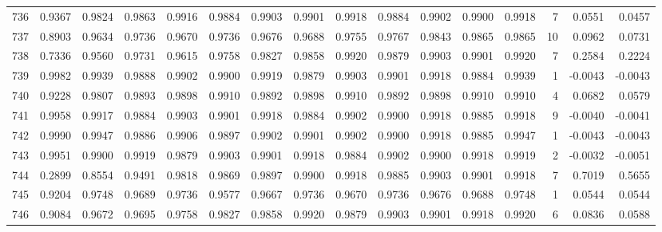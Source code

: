 \begin{tabular}{lrrrrrrrrrrrrrrr}
736 &      0.9367 &  0.9824 &  0.9863 &  0.9916 &  0.9884 &  0.9903 &  0.9901 &  0.9918 &  0.9884 &  0.9902 &   0.9900 &     0.9918 &      7 &                    0.0551 &                     0.0457 \\
737 &      0.8903 &  0.9634 &  0.9736 &  0.9670 &  0.9736 &  0.9676 &  0.9688 &  0.9755 &  0.9767 &  0.9843 &   0.9865 &     0.9865 &     10 &                    0.0962 &                     0.0731 \\
738 &      0.7336 &  0.9560 &  0.9731 &  0.9615 &  0.9758 &  0.9827 &  0.9858 &  0.9920 &  0.9879 &  0.9903 &   0.9901 &     0.9920 &      7 &                    0.2584 &                     0.2224 \\
739 &      0.9982 &  0.9939 &  0.9888 &  0.9902 &  0.9900 &  0.9919 &  0.9879 &  0.9903 &  0.9901 &  0.9918 &   0.9884 &     0.9939 &      1 &                   -0.0043 &                    -0.0043 \\
740 &      0.9228 &  0.9807 &  0.9893 &  0.9898 &  0.9910 &  0.9892 &  0.9898 &  0.9910 &  0.9892 &  0.9898 &   0.9910 &     0.9910 &      4 &                    0.0682 &                     0.0579 \\
741 &      0.9958 &  0.9917 &  0.9884 &  0.9903 &  0.9901 &  0.9918 &  0.9884 &  0.9902 &  0.9900 &  0.9918 &   0.9885 &     0.9918 &      9 &                   -0.0040 &                    -0.0041 \\
742 &      0.9990 &  0.9947 &  0.9886 &  0.9906 &  0.9897 &  0.9902 &  0.9901 &  0.9902 &  0.9900 &  0.9918 &   0.9885 &     0.9947 &      1 &                   -0.0043 &                    -0.0043 \\
743 &      0.9951 &  0.9900 &  0.9919 &  0.9879 &  0.9903 &  0.9901 &  0.9918 &  0.9884 &  0.9902 &  0.9900 &   0.9918 &     0.9919 &      2 &                   -0.0032 &                    -0.0051 \\
744 &      0.2899 &  0.8554 &  0.9491 &  0.9818 &  0.9869 &  0.9897 &  0.9900 &  0.9918 &  0.9885 &  0.9903 &   0.9901 &     0.9918 &      7 &                    0.7019 &                     0.5655 \\
745 &      0.9204 &  0.9748 &  0.9689 &  0.9736 &  0.9577 &  0.9667 &  0.9736 &  0.9670 &  0.9736 &  0.9676 &   0.9688 &     0.9748 &      1 &                    0.0544 &                     0.0544 \\
746 &      0.9084 &  0.9672 &  0.9695 &  0.9758 &  0.9827 &  0.9858 &  0.9920 &  0.9879 &  0.9903 &  0.9901 &   0.9918 &     0.9920 &      6 &                    0.0836 &                     0.0588 \\

\end{tabular}
